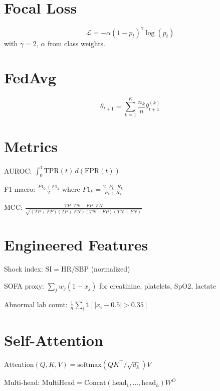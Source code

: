 \section{Focal Loss}

\begin{equation}
\mathcal{L} = -\alpha (1-p_t)^\gamma \log(p_t)
\end{equation}
with $\gamma = 2$, $\alpha$ from class weights.

\section{FedAvg}

\begin{equation}
\theta_{t+1} = \sum_{k=1}^{K} \frac{n_k}{n} \theta_{t+1}^{(k)}
\end{equation}

\section{Metrics}

AUROC: $\int_0^1 \text{TPR}(t) \, d(\text{FPR}(t))$

F1-macro: $\frac{F1_0 + F1_1}{2}$ where $F1_k = \frac{2 \cdot P_k \cdot R_k}{P_k + R_k}$

MCC: $\frac{TP \cdot TN - FP \cdot FN}{\sqrt{(TP+FP)(TP+FN)(TN+FP)(TN+FN)}}$

\section{Engineered Features}

Shock index: $\text{SI} = \text{HR} / \text{SBP}$ (normalized)

SOFA proxy: $\sum_{j} w_j (1 - x_j)$ for creatinine, platelets, SpO2, lactate

Abnormal lab count: $\frac{1}{n} \sum_{i} \mathbb{1}[|x_i - 0.5| > 0.35]$

\section{Self-Attention}

$\text{Attention}(Q,K,V) = \text{softmax}(QK^\top / \sqrt{d_k}) V$

Multi-head: $\text{MultiHead} = \text{Concat}(\text{head}_1, \ldots, \text{head}_h) W^O$
